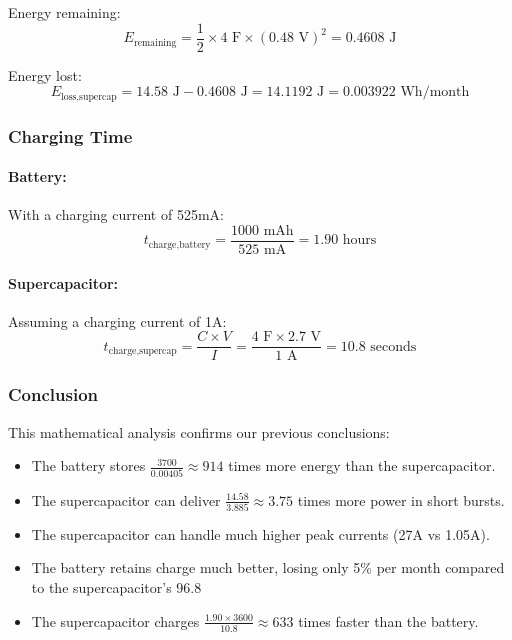\documentclass[a4paper,11pt]{article}%
\begin{document}
Energy remaining:
\begin{equation}
    E_{\text{remaining}} = \frac{1}{2} \times 4 \text{ F} \times (0.48 \text{ V})^2 = 0.4608 \text{ J}
\end{equation}

Energy lost:
\begin{equation}
    E_{\text{loss,supercap}} = 14.58 \text{ J} - 0.4608 \text{ J} = 14.1192 \text{ J} = 0.003922 \text{ Wh/month}
\end{equation}

\subsubsection{Charging Time}

\paragraph{Battery:}
With a charging current of 525mA:
\begin{equation}
    t_{\text{charge,battery}} = \frac{1000 \text{ mAh}}{525 \text{ mA}} = 1.90 \text{ hours}
\end{equation}

\paragraph{Supercapacitor:}
Assuming a charging current of 1A:
\begin{equation}
    t_{\text{charge,supercap}} = \frac{C \times V}{I} = \frac{4 \text{ F} \times 2.7 \text{ V}}{1 \text{ A}} = 10.8 \text{ seconds}
\end{equation}

\subsubsection{Conclusion}

This mathematical analysis confirms our previous conclusions:

\begin{itemize}
    \item The battery stores $\frac{3700}{0.00405} \approx 914$ times more energy than the supercapacitor.
    \item The supercapacitor can deliver $\frac{14.58}{3.885} \approx 3.75$ times more power in short bursts.
    \item The supercapacitor can handle much higher peak currents (27A vs 1.05A).
    \item The battery retains charge much better, losing only 5\% per month compared to the supercapacitor's 96.8%
    \item The supercapacitor charges $\frac{1.90 \times 3600}{10.8} \approx 633$ times faster than the battery.
\end{itemize}
\end{document}
